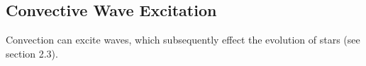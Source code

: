 {\color{purple}
\subsection{Convective Wave Excitation}
}

Convection can excite waves, which subsequently effect the evolution of stars (see section 2.3). 
